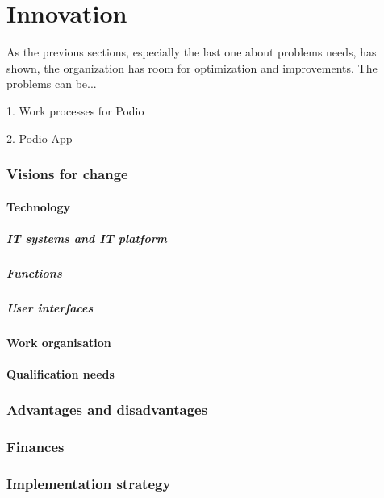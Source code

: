 \part{Innovation}
As the previous sections, especially the last one about problems needs, has shown, the organization has room for optimization and improvements. The problems can be...

1. Work processes for Podio

2. Podio App

\section{Visions for change}

\subsection{Technology}
\label{sub:technology}

\subsubsection{IT systems and IT platform}

\subsubsection{Functions}

\subsubsection{User interfaces}

\subsection{Work organisation}
\label{sub:work_organisation}

\subsection{Qualification needs}
\label{sub:qualification_needs}

\section{Advantages and disadvantages}

\section{Finances}

\section{Implementation strategy}


